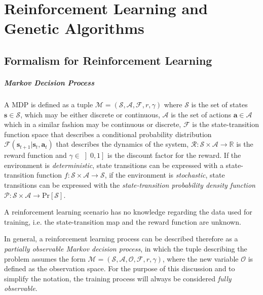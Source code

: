 \chapter{Reinforcement Learning and Genetic Algorithms}
\label{chp:back_RLGA}

\section{Formalism for Reinforcement Learning}

\paragraph{Markov Decision Process} A \ac{MDP} is defined as a tuple $\mathcal{M} = (\mathcal{S}, \mathcal{A}, \mathcal{F}, r, \gamma)$ where $\mathcal{S}$ is the set of states $\mathbf{s} \in \mathcal{S}$, which may be either discrete or continuous, $\mathcal{A}$ is the set of actions $\mathbf{a} \in \mathcal{A}$ which in a similar fashion may be continuous or discrete, $\mathcal{F}$ is the state-transition function space that describes a conditional probability distribution $\mathcal{F}(\mathbf{s} _{t+1}|\mathbf{s}_t, \mathbf{a} _t)$ that describes the dynamics of the system, $\mathcal{R} : \mathcal{S} \times \mathcal{A} \rightarrow \mathbb{R}$ is the reward function and $\gamma \in \left]0,1\right]$ is the discount factor for the reward. If the environment is \textit{deterministic}, state transitions can be expressed with a state-transition function $f: \mathcal{S} \times \mathcal{A} \rightarrow \mathcal{S}$, if the environment is \textit{stochastic}, state transitions can be expressed with the \textit{state-transition probability density function} $\mathcal{P}: \mathcal{S} \times \mathcal{A} \rightarrow \mathrm{Pr}[\mathcal{S}]$.

A reinforcement learning scenario has no knowledge regarding the data used for training, i.e. the state-transition map and the reward function are unknown.

In general, a reinforcement learning process can be described therefore as a \textit{partially observable Markov decision process}, in which the tuple describing the problem assumes the form $\mathcal{M} =  (\mathcal{S}, \mathcal{A}, \mathcal{O}, \mathcal{F}, r, \gamma)$, where the new variable $\mathcal{O}$ is defined as the observation space. For the purpose of this discussion and to simplify the notation, the training process will always be considered \textit{fully observable}.

